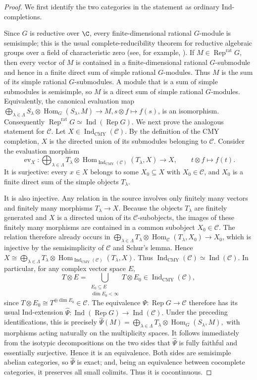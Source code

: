 \documentclass[12pt,leqno]{amsart}
\numberwithin{equation}{section} \newtheorem{thm}{Theorem}[section] \newtheorem{lem}[thm]{Lemma} \newtheorem{ex}[thm]{Example} \newtheorem{prop}[thm]{Proposition} \newtheorem{cor}[thm]{Corollary} \newtheorem{defi}[thm]{Definition} \newtheorem{rmk}[thm]{Remark} \newtheorem{notation}[thm]{Notation}
\newcommand{\Ind}{\operatorname{Ind}}
\newcommand{\Rep}{\operatorname{Rep}}
\newcommand{\Hom}{\operatorname{Hom}}
\newcommand{\IndCMY}{\operatorname{Ind}_{\mathrm{CMY}}}
\begin{document}
\begin{proof}
We first identify the two categories in the statement as ordinary Ind-completions.

Since $G$ is reductive over $\C$, every finite-dimensional rational $G$-module is semisimple; this is the usual complete-reducibility theorem for reductive algebraic groups over a field of characteristic zero (see, for example, \cite{SpringerLAG}). If $M\in\Rep^{\mathrm{rat}}G$, then every vector of $M$ is contained in a finite-dimensional rational $G$-submodule and hence in a finite direct sum of simple rational $G$-modules. Thus $M$ is the sum of its simple rational $G$-submodules. A module that is a sum of simple submodules is semisimple, so $M$ is a direct sum of simple rational $G$-modules. Equivalently, the canonical evaluation map \(\bigoplus_{\lambda\in\Lambda} S_\lambda\otimes\Hom_G(S_\lambda,M) \longrightarrow M, s\otimes f\longmapsto f(s)\), is an isomorphism. Consequently \(\Rep^{\mathrm{rat}}G\simeq\Ind(\Rep G).\) We next prove the analogous statement for $\mathcal C$. Let $X\in\IndCMY(\mathcal C)$. By the definition of the CMY completion, $X$ is the directed union of its submodules belonging to $\mathcal C$. Consider the evaluation morphism
\[
\operatorname{ev}_X:
\bigoplus_{\lambda\in\Lambda}
T_\lambda\otimes
\Hom_{\IndCMY(\mathcal C)}(T_\lambda,X)
\longrightarrow X,
\qquad
t\otimes f\longmapsto f(t).
\]
It is surjective: every $x\in X$ belongs to some $X_0\subseteq X$ with $X_0\in\mathcal C$, and $X_0$ is a finite direct sum of the simple objects $T_\lambda$.

It is also injective. Any relation in the source involves only finitely many vectors and finitely many morphisms $T_\lambda\to X$. Because the objects $T_\lambda$ are finitely generated and $X$ is a directed union of its $\mathcal C$-subobjects, the images of these finitely many morphisms are contained in a common subobject $X_0\in\mathcal C$. The relation therefore already occurs in \(\bigoplus_{\lambda\in\Lambda} T_\lambda\otimes\Hom_{\mathcal C}(T_\lambda,X_0) \longrightarrow X_0\), which is injective by the semisimplicity of $\mathcal C$ and Schur's lemma. Hence \(X\cong\bigoplus_{\lambda\in\Lambda}T_\lambda\otimes\Hom_{\IndCMY(\mathcal C)}(T_\lambda,X)\). Thus \(\IndCMY(\mathcal C)\simeq\Ind(\mathcal C).\) In particular, for any complex vector space $E$,
\[
T\otimes E
=
\bigcup_{\substack{E_0\subseteq E\\ \dim E_0<\infty}}
T\otimes E_0
\in\IndCMY(\mathcal C),
\]
since $T\otimes E_0\cong T^{\oplus\dim E_0}\in\mathcal C$. The equivalence $\Psi:\Rep G\to\mathcal C$ therefore has its usual Ind-extension \(\widehat\Psi:\Ind(\Rep G)\longrightarrow\Ind(\mathcal C).\) Under the preceding identifications, this is precisely \(\widehat\Psi(M)=\bigoplus_{\lambda\in\Lambda}T_\lambda\otimes\Hom_G(S_\lambda,M),\) with morphisms acting naturally on the multiplicity spaces. It follows immediately from the isotypic decompositions on the two sides that $\widehat\Psi$ is fully faithful and essentially surjective. Hence it is an equivalence. Both sides are semisimple abelian categories, so $\widehat\Psi$ is exact; and, being an equivalence between cocomplete categories, it preserves all small colimits. Thus it is cocontinuous.


\end{proof}
\end{document}
